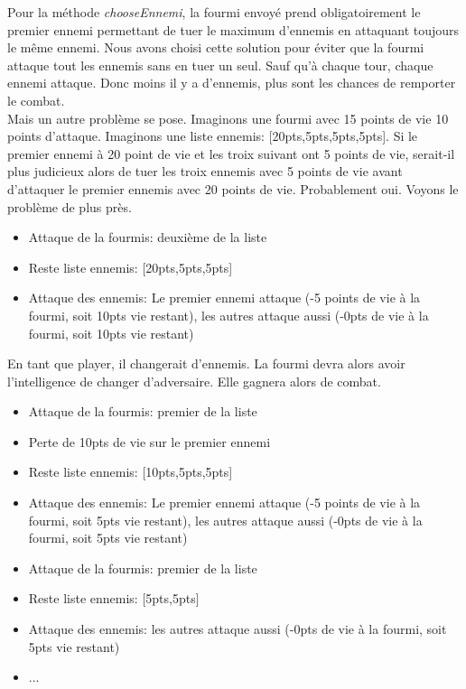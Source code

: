 		Pour la méthode \textit{chooseEnnemi}, la fourmi envoyé prend obligatoirement le premier ennemi permettant de tuer le maximum d'ennemis en attaquant toujours le même ennemi. Nous avons choisi cette solution pour éviter que la fourmi attaque tout les ennemis sans en tuer un seul. Sauf qu'à chaque tour, chaque ennemi attaque. Donc moins il y a d'ennemis, plus sont les chances de remporter le combat.\\
		Mais un autre problème se pose. Imaginons une fourmi avec 15 points de vie 10 points d'attaque. Imaginons une liste ennemis: [20pts,5pts,5pts,5pts]. Si le premier ennemi à 20 point de vie et les troix suivant ont 5 points de vie, serait-il plus judicieux alors de tuer les troix ennemis avec 5 points de vie avant d'attaquer le premier ennemis avec 20 points de vie. Probablement oui. Voyons le problème de plus près.
		\begin{itemize}
			\item Attaque de la fourmis: deuxième de la liste
			\item Reste liste ennemis: [20pts,5pts,5pts]
			\item Attaque des ennemis: Le premier ennemi attaque (-5 points de vie à la fourmi, soit 10pts vie restant), les autres attaque aussi (-0pts de vie à la fourmi, soit 10pts vie restant)\\
		\end{itemize}

		En tant que player, il changerait d'ennemis. La fourmi devra alors avoir l'intelligence de changer d'adversaire. Elle gagnera alors de combat.\\

		\begin{itemize}
			\item Attaque de la fourmis: premier de la liste
			\item Perte de 10pts de vie sur le premier ennemi
			\item Reste liste ennemis: [10pts,5pts,5pts]
			\item Attaque des ennemis: Le premier ennemi attaque (-5 points de vie à la fourmi, soit 5pts vie restant), les autres attaque aussi (-0pts de vie à la fourmi, soit 5pts vie restant)
			\item Attaque de la fourmis: premier de la liste
			\item Reste liste ennemis: [5pts,5pts]
			\item Attaque des ennemis: les autres attaque aussi (-0pts de vie à la fourmi, soit 5pts vie restant)
			\item ...
		\end{itemize}
